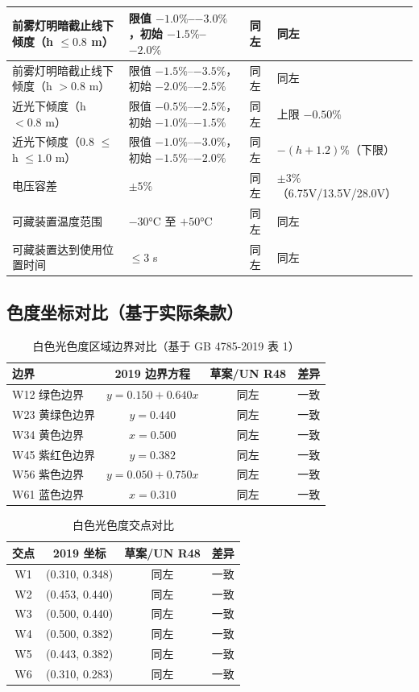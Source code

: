 \begin{table}[H]
\begin{tabularx}{\textwidth}{|X|X|X|X|}
\hline
前雾灯明暗截止线下倾度（h $\le 0.8$ m）& 限值 $-1.0\%$--$-3.0\%$，初始 $-1.5\%$--$-2.0\%$ & 同左 & 同左 \\
\hline
前雾灯明暗截止线下倾度（h $> 0.8$ m）& 限值 $-1.5\%$--$-3.5\%$，初始 $-2.0\%$--$-2.5\%$ & 同左 & 同左 \\
\hline
近光下倾度（h $< 0.8$ m）& 限值 $-0.5\%$--$-2.5\%$，初始 $-1.0\%$--$-1.5\%$ & 同左 & 上限 $-0.50\%$ \\
\hline
近光下倾度（0.8 $\le$ h $\le 1.0$ m）& 限值 $-1.0\%$--$-3.0\%$，初始 $-1.5\%$--$-2.0\%$ & 同左 & $-(h+1.2)\%$（下限）\\
\hline
电压容差 & $\pm 5\%$ & 同左 & $\pm 3\%$（6.75V/13.5V/28.0V）\\
\hline
可藏装置温度范围 & $-30°\text{C}$ 至 $+50°\text{C}$ & 同左 & 同左 \\
\hline
可藏装置达到使用位置时间 & $\le 3$ s & 同左 & 同左 \\
\hline
\end{tabularx}
\end{table}

\subsection{色度坐标对比（基于实际条款）}

\begin{table}[H]
\centering
\caption{白色光色度区域边界对比（基于 GB 4785-2019 表 1）}
\begin{tabular}{|l|c|c|c|}
\hline
\textbf{边界} & \textbf{2019 边界方程} & \textbf{草案/UN R48} & \textbf{差异} \\
\hline
W12 绿色边界  & $y = 0.150 + 0.640x$ & 同左 & 一致 \\
\hline
W23 黄绿色边界 & $y = 0.440$ & 同左 & 一致 \\
\hline
W34 黄色边界  & $x = 0.500$ & 同左 & 一致 \\
\hline
W45 紫红色边界 & $y = 0.382$ & 同左 & 一致 \\
\hline
W56 紫色边界  & $y = 0.050 + 0.750x$ & 同左 & 一致 \\
\hline
W61 蓝色边界  & $x = 0.310$ & 同左 & 一致 \\
\hline
\end{tabular}
\end{table}

\begin{table}[H]
\centering
\caption{白色光色度交点对比}
\begin{tabular}{|c|c|c|c|}
\hline
\textbf{交点} & \textbf{2019 坐标} & \textbf{草案/UN R48} & \textbf{差异} \\
\hline
W1 & (0.310, 0.348) & 同左 & 一致 \\
\hline
W2 & (0.453, 0.440) & 同左 & 一致 \\
\hline
W3 & (0.500, 0.440) & 同左 & 一致 \\
\hline
W4 & (0.500, 0.382) & 同左 & 一致 \\
\hline
W5 & (0.443, 0.382) & 同左 & 一致 \\
\hline
W6 & (0.310, 0.283) & 同左 & 一致 \\
\hline
\end{tabular}
\end{table}

